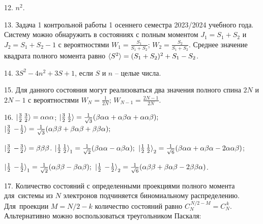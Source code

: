 12. $n^2.$\par
13. Задача 1 контрольной работы 1 осеннего семестра 2023/2024 учебного года. Систему можно обнаружить в состояниях с полным моментом $J_1=S_1+S_2$ и $J_2=S_1+S_2-1$ с вероятностями $W_1=\frac{S_1}{S_1+S_2}$; $W_2=\frac{S_2}{S_1+S_2}$. Среднее значение квадрата полного момента равно $\braket{S^2}=(S_1+S_2 )^2+S_1-S_2$.
\par
14. $3S^2-4n^2+3S+1$, если $S$ и $n$ – целые числа.\par
15. Для данного состояния могут реализоваться два значения полного спина $2N$ и $2N-1$ с вероятностями $W_{N}=\frac{1}{2N}$; $W_{N-1}=\frac{2N-1}{2N}$.\par
16. $\ket{\frac{3}{2}\,\frac{3}{2}}=\alpha\alpha\alpha$;\hspace{\fill}
$\ket{\frac{3}{2}\,\frac{1}{2}}=\frac{1}{\sqrt3}( \beta\alpha\alpha+\alpha\beta\alpha +\alpha\alpha\beta);$\hspace{\fill}$\ket{\frac{3}{2}\,-\!\frac{1}{2}}=\frac{1}{\sqrt3}( \alpha\beta\beta +\beta\alpha\beta +\beta\beta\alpha);$\par
\vspace{-\parskip+1mm}
$\ket{\frac{3}{2}\,-\!\frac{3}{2}}=\beta\beta\beta$. \hspace{\fill} $\ket{\frac{1}{2}\,\frac{1}{2}}_1 = \frac{1}{\sqrt2}( \beta\alpha\alpha-\alpha\beta\alpha);$ \hspace{\fill} $\ket{\frac{1}{2}\,\frac{1}{2}}_2 = \frac{1}{\sqrt6}( \beta\alpha\alpha+\alpha\beta\alpha -2\alpha\alpha\beta)$;\par
\vspace{-\parskip+1mm}
$\ket{\frac{1}{2}\,-\!\frac{1}{2}}_1 = \frac{1}{\sqrt2}( \alpha\beta\beta-\beta\alpha\beta);$ \quad $\ket{\frac{1}{2}\,-\!\frac{1}{2}}_2 = \frac{1}{\sqrt6}( \alpha\beta\beta+\beta\alpha\beta -2\beta\beta\alpha)$.
\par
17. Количество состояний с определенными проекциями полного момента для~системы из $N$ электронов подчиняется биномиальному распределению. Для~проекции $M =N/2-k$ количество состояний равно $C_{N}^{\,N/2-M}=C_{N}^{\,k}$. Альтернативно можно воспользоваться треугольником Паскаля:\par
\vspace{0.7mm}
\hspace{\fill}
